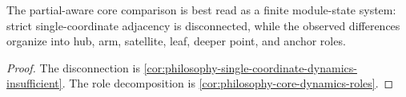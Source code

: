 \begin{corollary}
\label{cor:philosophy-module-state-allowed-claim}
The partial-aware core comparison is best read as a finite module-state
system: strict single-coordinate adjacency is disconnected, while the
observed differences organize into hub, arm, satellite, leaf, deeper
point, and anchor roles.
\end{corollary}
\begin{proof}
The disconnection is
\autoref{cor:philosophy-single-coordinate-dynamics-insufficient}. The
role decomposition is \autoref{cor:philosophy-core-dynamics-roles}.
\end{proof}
